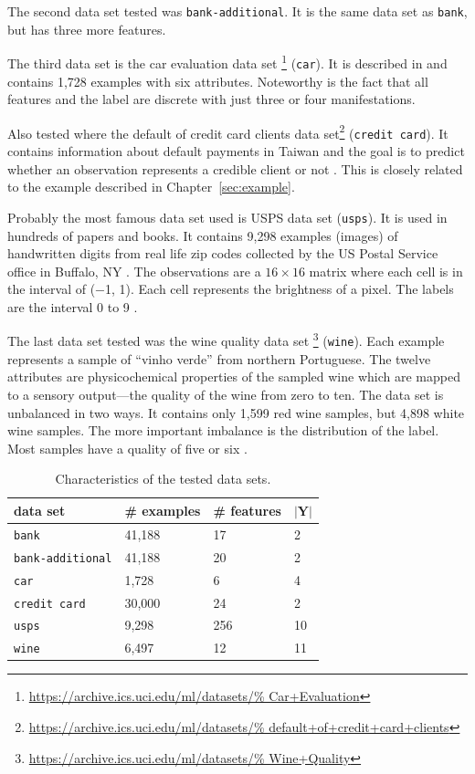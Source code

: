 \documentclass[twoside,11pt]{article}
\def\Y{\textbf{Y}}
\begin{document}
The second data set tested was \texttt{bank-additional}.
It is the same data set as \texttt{bank}, but has three
more features.

The third data set is the car evaluation data set%
\footnote{\url{https://archive.ics.uci.edu/ml/datasets/%
  Car+Evaluation}} (\texttt{car}).
It is described in \citet{bohanec_et_al_1988} and contains
1,728 examples with six attributes. Noteworthy is the fact
that all features and the label are discrete with
just three or four manifestations.

Also tested where the default of credit card clients data
set\footnote{\url{https://archive.ics.uci.edu/ml/datasets/%
  default+of+credit+card+clients}} (\texttt{credit card}).
It contains information about default payments in Taiwan
and the goal is to predict whether an observation
represents a credible client or not
\citep[see][]{yeh_et_al_2009}.
This is closely related to the example described in
Chapter~\ref{sec:example}.

Probably the most famous data set used is USPS data set
(\texttt{usps}). It is used in hundreds of papers and
books.
It contains 9,298 examples (images) of handwritten digits
from real life zip codes collected by the US Postal Service
office in Buffalo, NY \citep[see][Appendix B.1]{alrw}.
The observations are a $16 \times 16$ matrix where each
cell is in the interval of (−1, 1).
Each cell represents the brightness of a pixel. The labels
are the interval 0 to 9
\citep[see][]{lecun_et_al_1989, fassbender_2019}.

The last data set tested was the wine quality data set%
\footnote{\url{https://archive.ics.uci.edu/ml/datasets/%
  Wine+Quality}} (\texttt{wine}).
Each example represents a sample of ``vinho verde'' from
northern Portuguese.
The twelve attributes are physicochemical properties of the
sampled wine which are mapped to a sensory output---the
quality of the wine from zero to ten.
The data set is unbalanced in two ways. It contains only
1,599 red wine samples, but 4,898 white wine samples.
The more important imbalance is the distribution of the
label. Most samples have a quality of five or six
\citep[see][]{cortez_et_al_2009}.

\begin{table}
  \begin{center}
  \begin{tabu}{llll}
    data set &\# examples &\# features &$|\Y|$ \\ \hline
    \texttt{bank} &41,188 &17 &2 \\
    \texttt{bank-additional} &41,188 &20 &2 \\
    \texttt{car} &1,728 &6 &4 \\
    \texttt{credit card} &30,000 &24 &2 \\
    \texttt{usps} &9,298 &256 &10 \\
    \texttt{wine} &6,497 &12 &11 \\
  \end{tabu}
  \end{center}
  \caption{Characteristics of the tested data sets.}
\end{table}
\end{document}
